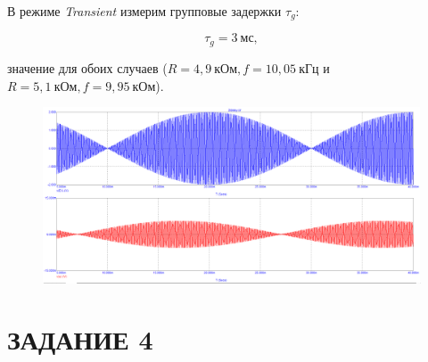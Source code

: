 \documentclass[a4paper, 12pt]{article}%
\begin{document}
\begin{enumerate}
В режиме \textit{Transient} измерим групповые задержки $\tau_g$:

\[\tau_g = 3 \: \textit{мс},\]

значение для обоих случаев ($R = 4,9 \: \textit{кОм}, f = 10,05 \: \textit{кГц}$ и $R = 5,1 \: \textit{кОм}, f = 9,95 \: \textit{кОм}$).

\begin{figure}[h!]
\centering
\includegraphics[scale=0.4]{2tdelay_AC2.png}
\label{fig:Image1}
\end{figure}

\end{enumerate}

\section*{ЗАДАНИЕ 4}
\end{document}
